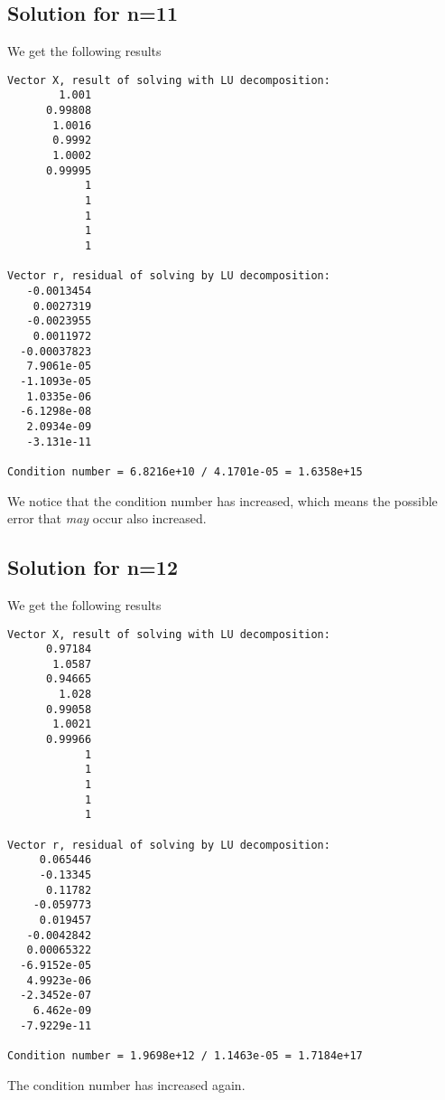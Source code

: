 \documentclass[11pt, a4paper, titlepage, openright]{article}
\begin{document}
\subsection{Solution for n=11}
    We get the following results
\begin{lstlisting}
Vector X, result of solving with LU decomposition:
        1.001
      0.99808
       1.0016
       0.9992
       1.0002
      0.99995
            1
            1
            1
            1
            1

Vector r, residual of solving by LU decomposition:
   -0.0013454
    0.0027319
   -0.0023955
    0.0011972
  -0.00037823
   7.9061e-05
  -1.1093e-05
   1.0335e-06
  -6.1298e-08
   2.0934e-09
   -3.131e-11

Condition number = 6.8216e+10 / 4.1701e-05 = 1.6358e+15
\end{lstlisting}
    We notice that the condition number has increased, which means the possible error that \emph{may} occur also increased.


\subsection{Solution for n=12}
    We get the following results
\begin{lstlisting}
Vector X, result of solving with LU decomposition:
      0.97184
       1.0587
      0.94665
        1.028
      0.99058
       1.0021
      0.99966
            1
            1
            1
            1
            1

Vector r, residual of solving by LU decomposition:
     0.065446
     -0.13345
      0.11782
    -0.059773
     0.019457
   -0.0042842
   0.00065322
  -6.9152e-05
   4.9923e-06
  -2.3452e-07
    6.462e-09
  -7.9229e-11

Condition number = 1.9698e+12 / 1.1463e-05 = 1.7184e+17
\end{lstlisting}
    The condition number has increased again.
\end{document}
